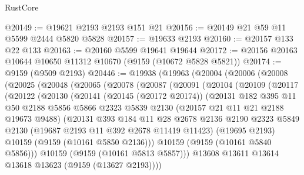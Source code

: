 \begin{lexlean}{RustCore}
\begin{coremodule}
@20149 := @19621 @2193 @2193 @151 @21
@20156 := @20149 @21 @59 @11 @5599 @2444 @5820 @5828
@20157 := @19633 @2193
@20160 := @20157 @133 @22 @133
@20163 := @20160 @5599 @19641 @19644
@20172 := @20156 @20163 @10644 @10650 @11312 @10670 (@9159 (@10672 @5828 @5821))
@20174 := @9159 (@9509 @2193)
@20446 := @19938
    (@19963
      (@20004
        (@20006
          (@20008
            (@20025
              (@20048
                (@20065
                  (@20078
                    (@20087
                      (@20091
                        (@20104
                          (@20109
                            (@20117
                              (@20122
                                (@20130
                                  (@20141
                                    (@20145 (@20172 @20174))
                                    (@20131
                                      @182
                                      @395
                                      @11
                                      @50
                                      @2188
                                      @5856
                                      @5866
                                      @2323
                                      @5839
                                      @2130
                                      (@20157 @21 @11 @21 @2188 @19673 @9488)
                                      (@20131
                                        @393
                                        @184
                                        @11
                                        @28
                                        @2678
                                        @2136
                                        @2190
                                        @2323
                                        @5849
                                        @2130
                                        (@19687 @2193 @11 @392 @2678 @11419 @11423)
                                        (@19695 @2193)
                                        @10159
                                        (@9159 (@10161 @5850 @2136)))
                                      @10159
                                      (@9159 (@10161 @5840 @5856)))
                                    @10159
                                    (@9159 (@10161 @5813 @5857)))
                                  @13608
                                  @13611
                                  @13614
                                  @13618
                                  @13623
                                  (@9159 (@13627 @2193))))

\end{coremodule}
\end{lexlean}
